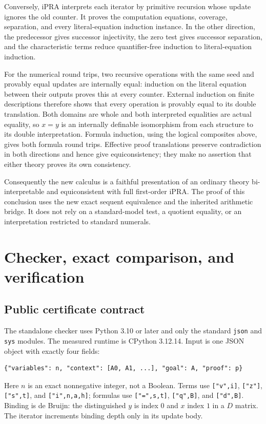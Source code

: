 \documentclass[11pt]{article}
\theoremstyle{definition}\newtheorem{definition}[theorem]{Definition}
\begin{document}
Conversely, iPRA interprets each iterator by primitive recursion whose
update ignores the old counter.  It proves the computation equations,
coverage, separation, and every literal-equation induction instance.
In the other direction, the predecessor gives successor injectivity,
the zero test gives successor separation, and the characteristic terms
reduce quantifier-free induction to literal-equation induction.

For the numerical round trips, two recursive operations with the same
seed and provably equal updates are internally equal: induction on the
literal equation between their outputs proves this at every counter.
External induction on finite descriptions therefore shows that every
operation is provably equal to its double translation.  Both domains
are whole and both interpreted equalities are actual equality, so
$x=y$ is an internally definable isomorphism from each structure to its
double interpretation.  Formula induction, using the logical composites
above, gives both formula round trips.  Effective proof translations
preserve contradiction in both directions and hence give
equiconsistency; they make no assertion that either theory proves its
own consistency.

Consequently the new calculus is a faithful presentation of an ordinary
theory bi-interpretable and equiconsistent with full first-order iPRA.
The proof of this conclusion uses the new exact sequent equivalence and
the inherited arithmetic bridge.  It does not rely on a standard-model
test, a quotient equality, or an interpretation restricted to standard
numerals.


\section{Checker, exact comparison, and verification}\label{sec:implementation}

\subsection{Public certificate contract}
The standalone checker uses Python 3.10 or later and only the standard
\texttt{json} and \texttt{sys} modules. The measured runtime is CPython
3.12.14. Input is one JSON object with exactly four fields:
\begin{lstlisting}
{"variables": n, "context": [A0, A1, ...], "goal": A, "proof": p}
\end{lstlisting}
Here $n$ is an exact nonnegative integer, not a Boolean. Terms use
\texttt{["v",i]}, \texttt{["z"]}, \texttt{["s",t]}, and
\texttt{["i",n,a,h]}; formulas use \texttt{["=",s,t]},
\texttt{["q",B]}, and \texttt{["d",B]}. Binding is de Bruijn:
the distinguished $y$ is index $0$ and $x$ index $1$ in a $D$ matrix.
The iterator increments binding depth only in its update body.
\end{document}
